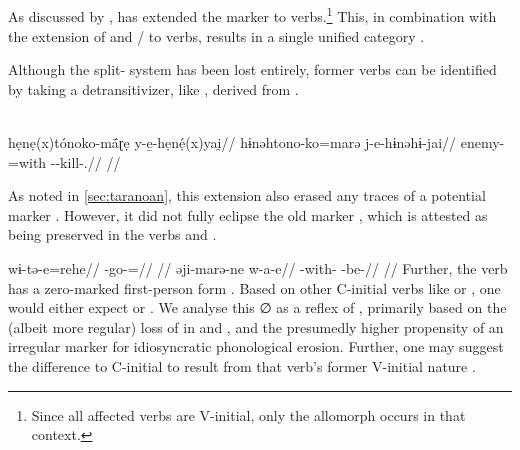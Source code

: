 \subsection{\carijo {}}
\label{sec:carijo}
As discussed by \textcite[105--107]{meira1998proto}, \carijo has extended the  marker  to  verbs.\footnote{Since all affected  verbs are V-initial, only the  allomorph  occurs in that context.}
This, in combination with the extension of   and  / to  verbs, results in a single unified  category .
%

%
Although the split- system has been lost entirely, former  verbs can be identified by taking a detransitivizer, like  , derived from   \parencite[179]{robayo2000avance} .

\carijo \parencite[][79]{koch1908hiana}\\
\begingl
\glpreamble hẹnẹ(x)tónoko-mā́ɽẹ y-e̱-hẹnẹ́(x)yai̯//
\gla hɨnəhtono-ko=marə j-e-hɨnəhɨ-jai//
\glb enemy-=with --kill-.//
\glft {}//
\endgl
\xe
%

%

As noted in \cref{sec:taranoan}, this extension also erased any traces of a potential \PTar {} marker .
However, it did not fully eclipse the old  marker , which is attested as being preserved in the verbs    and   .

\carijo \parencite[][5, 42]{guerrero2016karihona}
\begingl
\gla wɨ-tə-e=rehe//
\glb {}-go-=//
\glft {}//
\endgl
{}
\begingl
\gla əji-marə-ne w-a-e//
\glb {}-with- -be-//
\glft {}//
\endgl
\xe
%
Further, the verb   has a zero-marked first-person form .
Based on other C-initial verbs like   or  , one would either expect  or .
We analyse this ∅ as a reflex of , primarily based on the (albeit more regular) loss of  in \ikpeng and \hixka, and the presumedly higher propensity of an irregular marker for idiosyncratic phonological erosion.
Further, one may suggest the difference to C-initial   to result from that verb's former V-initial nature .

